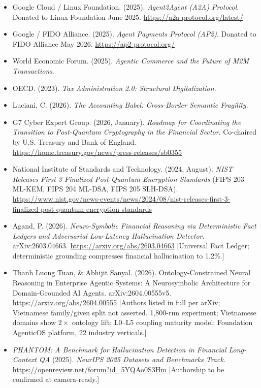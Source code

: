 \documentclass[12pt]{clapps}  %
\begin{document}
\begin{itemize}
    \item Google Cloud / Linux Foundation. (2025). \textit{Agent2Agent (A2A) Protocol}. Donated to Linux Foundation June 2025. \url{https://a2a-protocol.org/latest/}
    \item Google / FIDO Alliance. (2025). \textit{Agent Payments Protocol (AP2)}. Donated to FIDO Alliance May 2026. \url{https://ap2-protocol.org/}
    \item World Economic Forum. (2025). \textit{Agentic Commerce and the Future of M2M Transactions}.
    \item OECD. (2023). \textit{Tax Administration 2.0: Structural Digitalization}.
    \item Luciani, C. (2026). \textit{The Accounting Babel: Cross-Border Semantic Fragility}.
    \item G7 Cyber Expert Group. (2026, January). \textit{Roadmap for Coordinating the Transition to Post-Quantum Cryptography in the Financial Sector}. Co-chaired by U.S. Treasury and Bank of England. \url{https://home.treasury.gov/news/press-releases/sb0355}
    \item National Institute of Standards and Technology. (2024, August). \textit{NIST Releases First 3 Finalized Post-Quantum Encryption Standards} (FIPS 203 ML-KEM, FIPS 204 ML-DSA, FIPS 205 SLH-DSA). \url{https://www.nist.gov/news-events/news/2024/08/nist-releases-first-3-finalized-post-quantum-encryption-standards}
    \item Agand, P. (2026). \textit{Neuro-Symbolic Financial Reasoning via Deterministic Fact Ledgers and Adversarial Low-Latency Hallucination Detector}. arXiv:2603.04663. \url{https://arxiv.org/abs/2603.04663} [Universal Fact Ledger; deterministic grounding compresses financial hallucination to 1.2\%.]
    \item Thanh Luong Tuan, \& Abhijit Sanyal. (2026). Ontology-Constrained Neural Reasoning in Enterprise Agentic Systems: A Neurosymbolic Architecture for Domain-Grounded AI Agents. arXiv:2604.00555v5. \url{https://arxiv.org/abs/2604.00555} [Authors listed in full per arXiv; Vietnamese family/given split not asserted. 1,800-run experiment; Vietnamese domains show $2\times$ ontology lift; L0--L5 coupling maturity model; Foundation AgenticOS platform, 22 industry verticals.]
    \item \textit{PHANTOM: A Benchmark for Hallucination Detection in Financial Long-Context QA} (2025). \textit{NeurIPS 2025 Datasets and Benchmarks Track}. \url{https://openreview.net/forum?id=5YQAo0S3Hm} [Authorship to be confirmed at camera-ready.]

\end{itemize}
\end{document}
